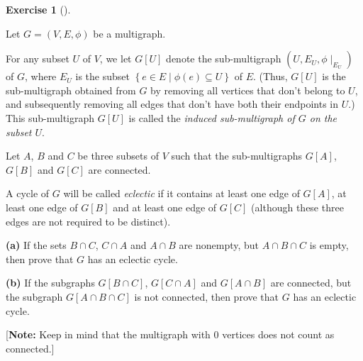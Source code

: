 \documentclass[numbers=enddot,12pt,final,onecolumn,notitlepage]{scrartcl}%
\newcounter{exer}
\theoremstyle{definition}
\newtheorem{exmp}[exer]{Exercise}
\newenvironment{exercise}[1][]
{\begin{exmp}[#1]\begin{leftbar}}
{\end{leftbar}\end{exmp}}
\newcommand{\set}[1]{\left\{ #1 \right\}}
\newcommand{\tup}[1]{\left( #1 \right)}
\newcommand{\ive}[1]{\left[ #1 \right]}
\begin{document}
\begin{exercise} \label{exe.mt2.eclectic-cycle}
Let $G = \tup{V, E, \phi}$ be a multigraph.

For any subset $U$ of $V$, we let $G \ive{U}$ denote the
sub-multigraph $\tup{U, E_U, \phi\mid_{E_U}}$ of $G$, where
$E_U$ is the subset $\set{e \in E \mid \phi \tup{e} \subseteq U}$ of
$E$.
(Thus, $G \ive{U}$ is the sub-multigraph obtained from $G$ by removing
all vertices that don't belong to $U$, and subsequently removing all
edges that don't have both their endpoints in $U$.)
This sub-multigraph $G \ive{U}$ is called the \textit{induced
sub-multigraph of $G$ on the subset $U$}.

Let $A$, $B$ and $C$ be three subsets of $V$ such that the
sub-multigraphs $G \ive{A}$, $G \ive{B}$ and $G \ive{C}$ are
connected.

A cycle of $G$ will be called \textit{eclectic} if it contains at
least one edge of $G \ive{A}$, at least one edge of $G \ive{B}$ and
at least one edge of $G \ive{C}$ (although these three edges are not
required to be distinct).

\textbf{(a)} If the sets $B \cap C$, $C \cap A$ and $A \cap B$ are
nonempty, but $A \cap B \cap C$ is empty, then prove that $G$ has an
eclectic cycle.

\textbf{(b)} If the subgraphs $G \ive{B \cap C}$, $G \ive{C \cap A}$
and $G \ive{A \cap B}$ are connected, but the subgraph
$G \ive{A \cap B \cap C}$ is not connected, then prove that $G$ has
an eclectic cycle.

[\textbf{Note:} Keep in mind that the multigraph with $0$ vertices
does not count as connected.]
\end{exercise}
\end{document}
